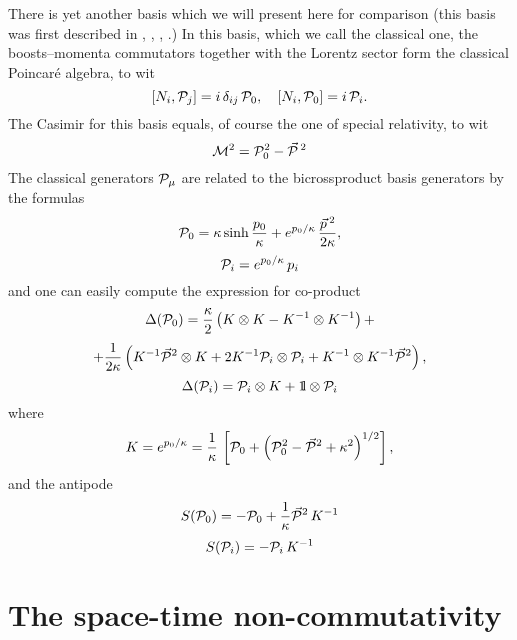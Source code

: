 \documentclass[a4paper,a4paper]{article}
\def\bbbone{{\mathchoice {\rm 1\mskip-4mu l} {\rm 1\mskip-4mu l}
{\rm 1\mskip-4.5mu l} {\rm 1\mskip-5mu l}}}
\begin{document}
There is yet another basis which we will present here for
comparison (this basis was first described in \cite{maslanka},
\cite{kolumaso}, \cite{lukclas}, \cite{luruza}.) In this basis,
which we call the classical one, the boosts--momenta commutators
together with the Lorentz sector form the classical Poincar\'e
algebra, to wit
\begin{equation}\label{12}
   \left[N_{i}, {\cal P}_{j}\right] = i\, \delta_{ij}\, {\cal P}_0  ,\quad \left[N_{i}, {\cal P}_{0}\right] = i\,
   {\cal P}_i.
\end{equation}
The Casimir for this basis equals, of course the one of special relativity, to wit
\begin{equation}\label{12a}
 {\cal M}^2 = {\cal P}_0^2 - \vec{\cal P}\,{}^2
\end{equation}
The classical generators ${\cal P}_\mu$ are related to the bicrossproduct basis generators by the formulas
\begin{equation}\label{13}
 {\cal P}_{0} = \kappa \sinh\frac{p_0}\kappa + e^{p_0/\kappa}\, \frac{\vec{p}\, {}^2}{2\kappa},
\end{equation}
\begin{equation}\label{14}
 {\cal P}_{i}= e^{p_0/\kappa} \, p_i
\end{equation}
and one can easily compute the expression for co-product
$$
  \Delta({\cal P}_{0}) = \frac\kappa2\left(K \otimes K - K^{-1}\otimes K^{-1}\right)+$$
  \begin{equation}\label{15}
  + \frac1{2\kappa}\left(K^{-1} \vec{{\cal P}}{}^2 \otimes K +
  2K^{-1} {\cal P}_i \otimes {\cal P}_i + K^{-1}\otimes K^{-1}\vec{{\cal P}}{}^2\right),
\end{equation}
\begin{equation}\label{15a}
 \Delta({\cal P}_{i}) ={\cal P}_{i}\otimes K + \bbbone\otimes {\cal P}_{i}
\end{equation}
where
$$
K = e^{p_0/\kappa} = \frac1\kappa\, \left[ {\cal P}_{0} + \left(
{\cal P}_{0}^2 - \vec{{\cal P}}{}^2  +
\kappa^2\right)^{1/2}\right],
$$
and the antipode
\begin{equation}\label{15s1}
    S({\cal P}_{0})=-{\cal P}_{0} + \frac1\kappa\vec{{\cal
    P}}{}^2\, K^{-1}
\end{equation}
\begin{equation}\label{15s2}
  S({\cal P}_{i})=-{\cal P}_{i}\, K^{-1}
\end{equation}

\section{The space-time non-commutativity}
\end{document}
